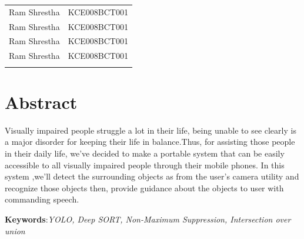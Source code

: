 			\begin{tabular}{p{2in}p{3in}}
    			Ram Shrestha & KCE008BCT001\\
    			Ram Shrestha & KCE008BCT001\\
    			Ram Shrestha & KCE008BCT001\\
    			Ram Shrestha & KCE008BCT001\\
    		 \vspace{0.3in}
    		\end{tabular}
		\break
		
		\large
			\chapter*{Abstract}
		\normalsize
		Visually impaired people struggle a lot in their life, being unable to see clearly is a major disorder for keeping their life in balance.Thus, for assisting those people in their daily life, we've decided to make a portable system that can be easily accessible to all visually impaired people through their mobile phones. In this system ,we'll detect the surrounding objects as from the user's camera utility and recognize those objects then, provide guidance about the objects to user with commanding speech. 

		\textbf{Keywords}:\textit{YOLO, Deep SORT, Non-Maximum Suppression, Intersection over union}

		\break

		\tableofcontents
		
		\break
		\pagebreak

		\listoffigures
		\break
	
	
	
		\Large
			\begingroup
				\let\clearpage\relax

